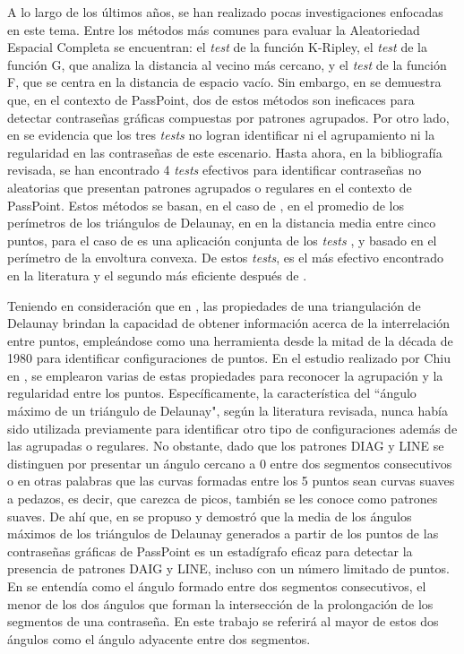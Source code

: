 \documentclass[12pt]{report}
\begin{document}
	A lo largo de los últimos años, se han realizado pocas investigaciones enfocadas en este tema. Entre los métodos más comunes para evaluar la Aleatoriedad Espacial Completa se encuentran: el \textit{test} de la función K-Ripley, el \textit{test} de la función G, que analiza la distancia al vecino más cercano, y el \textit{test} de la función F, que se centra en la distancia de espacio vacío. Sin embargo, en \cite{6,7} se demuestra que, en el contexto de PassPoint, dos de estos métodos son ineficaces para detectar contraseñas gráficas compuestas por patrones agrupados. Por otro lado, en \cite{7,8} se evidencia que los tres \textit{tests} no logran identificar ni el agrupamiento ni la regularidad en las contraseñas de este escenario. Hasta ahora, en la bibliografía revisada, se han encontrado 4 \textit{tests} efectivos \cite{7,9,10,11} para identificar contraseñas no aleatorias que presentan patrones agrupados o regulares en el contexto de PassPoint. Estos métodos se basan, en el caso de \cite{9}, en el promedio de los perímetros de los triángulos de Delaunay, en  \cite{7} en la distancia media entre cinco puntos, para el caso de \cite{10} es una aplicación conjunta de los \textit{tests} \cite{7,9}, y \cite{11} basado en  el perímetro de la envoltura convexa. De estos \textit{tests}, \cite{11} es el más efectivo encontrado en la literatura y el segundo más eficiente después de \cite{7}.
	
	Teniendo en consideración que en \cite{12}, las propiedades de una triangulación de Delaunay brindan la capacidad de obtener información acerca de la interrelación entre puntos, empleándose como una herramienta desde la mitad de la década de 1980 para identificar configuraciones de puntos. En el estudio realizado por Chiu en \cite{12}, se emplearon varias de estas propiedades para reconocer la agrupación y la regularidad entre los puntos. Específicamente, la característica del ``ángulo máximo de un triángulo de Delaunay", según la literatura revisada, nunca había sido utilizada previamente para identificar otro tipo de configuraciones además de las agrupadas o regulares. No obstante, dado que los patrones DIAG y LINE se distinguen por presentar un ángulo cercano a 0{\degree } entre dos segmentos consecutivos o en otras palabras que las curvas formadas entre los 5 puntos sean curvas suaves a pedazos, es decir, que carezca de picos, también se les conoce como patrones suaves.  De ahí que, en \cite{13} se propuso y demostró que la media de los ángulos máximos de los triángulos de Delaunay generados a partir de los puntos de las contraseñas gráficas de PassPoint es un estadígrafo eficaz para detectar la presencia de patrones DAIG y LINE, incluso con un número limitado de puntos. En \cite{5} se entendía como el ángulo formado entre dos segmentos consecutivos, el menor de los dos ángulos que forman la intersección de la prolongación de los segmentos de una contraseña. En este trabajo se referirá al mayor de estos dos ángulos como el ángulo adyacente entre dos segmentos.
\end{document}
